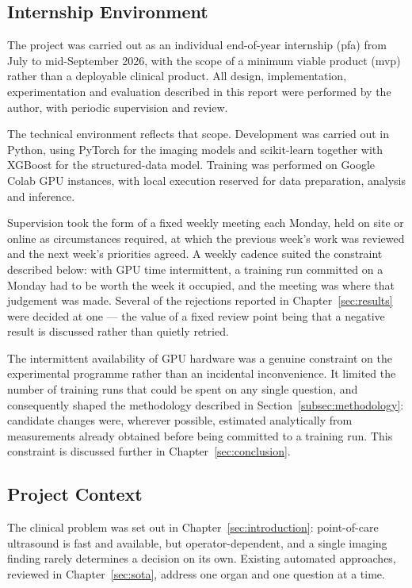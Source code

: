 \subsection{Internship Environment}
\label{subsec:internship-env}

The project was carried out as an individual end-of-year internship (\gls{pfa}) from July to
mid-September 2026, with the scope of a minimum viable product (\gls{mvp}) rather than a
deployable clinical product. All
design, implementation, experimentation and evaluation described in this report were
performed by the author, with periodic supervision and review.

The technical environment reflects that scope. Development was carried out in Python,
using PyTorch for the imaging models and scikit-learn together with XGBoost for the
structured-data model. Training was performed on Google Colab GPU instances, with local
execution reserved for data preparation, analysis and inference.

Supervision took the form of a fixed weekly meeting each Monday, held on site or online as
circumstances required, at which the previous week's work was reviewed and the next week's
priorities agreed. A weekly cadence suited the constraint described below: with GPU time
intermittent, a training run committed on a Monday had to be worth the week it occupied, and
the meeting was where that judgement was made. Several of the rejections reported in
Chapter~\ref{sec:results} were decided at one --- the value of a fixed review point being
that a negative result is discussed rather than quietly retried.

The intermittent availability of GPU hardware was a genuine constraint on the experimental
programme rather than an incidental inconvenience. It limited the number of training runs
that could be spent on any single question, and consequently shaped the methodology
described in Section~\ref{subsec:methodology}: candidate changes were, wherever possible,
estimated analytically from measurements already obtained before being committed to a
training run. This constraint is discussed further in Chapter~\ref{sec:conclusion}.

\subsection{Project Context}
\label{subsec:project-context}

The clinical problem was set out in Chapter~\ref{sec:introduction}: point-of-care
ultrasound is fast and available, but operator-dependent, and a single imaging finding
rarely determines a decision on its own. Existing automated approaches, reviewed in
Chapter~\ref{sec:sota}, address one organ and one question at a time.

